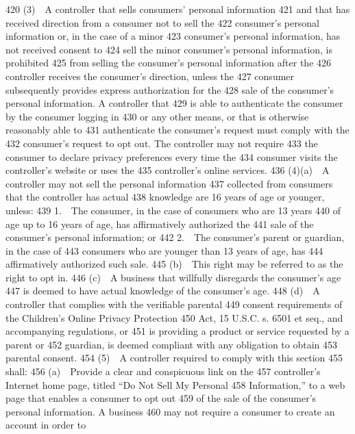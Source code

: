   420         (3) A controller that sells consumers’ personal information
  421  and that has received direction from a consumer not to sell the
  422  consumer’s personal information or, in the case of a minor
  423  consumer’s personal information, has not received consent to
  424  sell the minor consumer’s personal information, is prohibited
  425  from selling the consumer’s personal information after the
  426  controller receives the consumer’s direction, unless the
  427  consumer subsequently provides express authorization for the
  428  sale of the consumer’s personal information. A controller that
  429  is able to authenticate the consumer by the consumer logging in
  430  or any other means, or that is otherwise reasonably able to
  431  authenticate the consumer’s request must comply with the
  432  consumer’s request to opt out. The controller may not require
  433  the consumer to declare privacy preferences every time the
  434  consumer visits the controller’s website or uses the
  435  controller’s online services.
  436         (4)(a) A controller may not sell the personal information
  437  collected from consumers that the controller has actual
  438  knowledge are 16 years of age or younger, unless:
  439         1. The consumer, in the case of consumers who are 13 years
  440  of age up to 16 years of age, has affirmatively authorized the
  441  sale of the consumer’s personal information; or
  442         2. The consumer’s parent or guardian, in the case of
  443  consumers who are younger than 13 years of age, has
  444  affirmatively authorized such sale.
  445         (b) This right may be referred to as the right to opt in.
  446         (c) A business that willfully disregards the consumer’s age
  447  is deemed to have actual knowledge of the consumer’s age.
  448         (d) A controller that complies with the verifiable parental
  449  consent requirements of the Children’s Online Privacy Protection
  450  Act, 15 U.S.C. s. 6501 et seq., and accompanying regulations, or
  451  is providing a product or service requested by a parent or
  452  guardian, is deemed compliant with any obligation to obtain
  453  parental consent.
  454         (5) A controller required to comply with this section
  455  shall:
  456         (a) Provide a clear and conspicuous link on the
  457  controller’s Internet home page, titled “Do Not Sell My Personal
  458  Information,” to a web page that enables a consumer to opt out
  459  of the sale of the consumer’s personal information. A business
  460  may not require a consumer to create an account in order to

